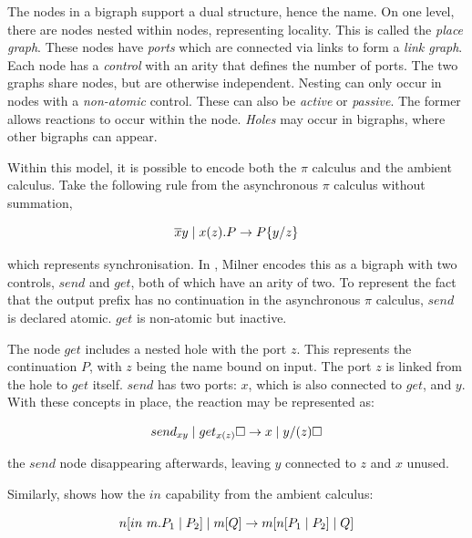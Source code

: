 The nodes in a bigraph support a dual structure, hence the name.  On one
level, there are nodes nested within nodes, representing locality.  This
is called the \emph{place graph}.  These nodes have \emph{ports} which
are connected via links to form a \emph{link graph}.  Each node has a
\emph{control} with an arity that defines the number of ports.  The two
graphs share nodes, but are otherwise independent.  Nesting can only
occur in nodes with a \emph{non-atomic} control.  These can also be
\emph{active} or \emph{passive}.  The former allows reactions to occur
within the node.  \emph{Holes} may occur in bigraphs, where other
bigraphs can appear.

Within this model, it is possible to encode both the $\pi$ calculus and
the ambient calculus.  Take the following rule from the asynchronous
$\pi$ calculus without summation,

\begin{equation}
\overline{x}y \;|\; x(z).P \rightarrow P\{y/z\}
\end{equation}

\noindent which represents synchronisation.  In \cite{bigraph1}, Milner
encodes this as a bigraph with two controls, $send$ and $get$, both of
which have an arity of two.  To represent the fact that the output
prefix has no continuation in the asynchronous $\pi$ calculus, $send$ is
declared atomic.  $get$ is non-atomic but inactive.

The node $get$ includes a nested hole with the port $z$.  This
represents the continuation $P$, with $z$ being the name bound on
input.  The port $z$ is linked from the hole to $get$ itself.  $send$
has two ports: $x$, which is also connected to $get$, and $y$.  With
these concepts in place, the reaction may be represented as:

\begin{equation}
send_{xy} \;|\; get_{x(z)} \square \rightarrow x \;|\; y/(z) \square
\end{equation}

\noindent the $send$ node disappearing afterwards, leaving $y$ connected
to $z$ and $x$ unused.

Similarly, \cite{bigraph1} shows how the $in$ capability from the
ambient calculus:

\begin{equation}
 n[in\ m.P_1 \;|\; P_2] \;|\; m[Q]
  \rightarrow
  m[n[P_1 \;|\; P_2] \;|\; Q] \\
\end{equation}

